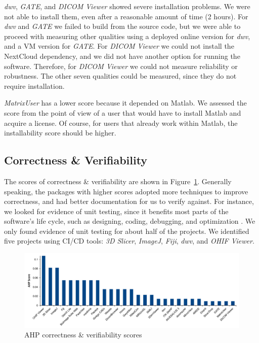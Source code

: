 \documentclass[final, 3p, times, authoryear]{elsarticle}
\begin{document}
\textit{dwv}, \textit{GATE}, and \textit{DICOM Viewer} showed severe
installation problems. We were not able to install them, even after a reasonable
amount of time (2 hours).  For \textit{dwv} and \textit{GATE} we failed to build
from the source code, but we were able to proceed with measuring other qualities
using a deployed online version for \textit{dwv}, and a VM version for
\textit{GATE}. For \textit{DICOM Viewer} we could not install the NextCloud
dependency, and we did not have another option for running the software.
Therefore, for \textit{DICOM Viewer} we could not measure reliability or
robustness.  The other seven qualities could be measured, since they do not
require installation.

\textit{MatrixUser} has a lower score because it depended on Matlab. We assessed
the score from the point of view of a user that would have to install Matlab and
acquire a license.  Of course, for users that already work within Matlab, the
installability score should be higher.

\subsection{Correctness \& Verifiability} \label{sec_result_correctness_verifiability}

The scores of correctness \& verifiability are shown in
Figure~\ref{fg_correctness_verifiability_scores}. Generally speaking, the
packages with higher scores adopted more techniques to improve correctness, and
had better documentation for us to verify against.  For instance, we looked for
evidence of unit testing, since it benefits most parts of the software's life
cycle, such as designing, coding, debugging, and optimization
\citep{Hamill2004}.  We only found evidence of unit testing for about half of
the projects. We identified five projects using CI/CD tools: \textit{3D Slicer},
\textit{ImageJ}, \textit{Fiji}, \textit{dwv}, and \textit{OHIF Viewer}.

\begin{figure}[!ht]
\includegraphics[scale=0.48]{figures/correctness_verifiability_scores.pdf}
\caption{AHP correctness \& verifiability scores}
\label{fg_correctness_verifiability_scores}
\end{figure}
\end{document}
